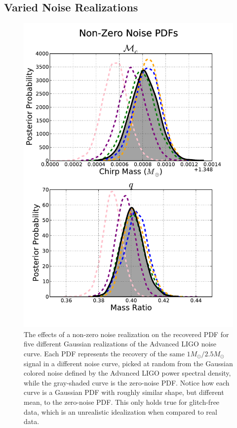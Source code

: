 \documentclass[11pt,a4paper]{emulateapj} 
\begin{document}
\subsection{Varied Noise Realizations}
\label{noiseSection}

\begin{figure}[ht!]
  \centering \includegraphics[trim=0cm 0cm 0cm 0cm,
    clip=true,scale=0.52]{noisePDF.pdf}
 \caption{The effects of a non-zero noise realization on the recovered
   PDF for five different Gaussian realizations of the Advanced LIGO
   noise curve.  Each PDF represents the recovery of the same
   $1M_{\odot}/2.5M_{\odot}$ signal in a different noise curve, picked
   at random from the Gaussian colored noise defined by the Advanced
   LIGO power spectral density, while the gray-shaded curve is the
   zero-noise PDF.  Notice how each curve is a Gaussian PDF with roughly similar shape,
   but different mean, to the zero-noise PDF.  This
   only holds true for glitch-free data, which is an unrealistic
   idealization when compared to real data.}
 \label{noisePDFs}
\end{figure}
  
\end{document}
